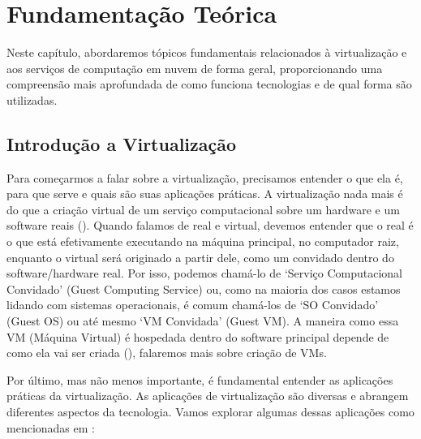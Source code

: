\chapter{Fundamentação Teórica}

Neste capítulo, abordaremos tópicos fundamentais relacionados à virtualização e aos serviços de computação em nuvem de forma geral, proporcionando uma compreensão mais aprofundada de como funciona tecnologias e de qual forma são utilizadas.


\section{Introdução a Virtualização}

Para começarmos a falar sobre a virtualização, precisamos entender o que ela é, para que serve e quais são suas aplicações práticas. A virtualização nada mais é do que a criação virtual de um serviço computacional sobre um hardware e um software reais (\cite{chirammal2016mastering}). Quando falamos de real e virtual, devemos entender que o real é o que está efetivamente executando na máquina principal, no computador raiz, enquanto o virtual será originado a partir dele, como um convidado dentro do software/hardware real. Por isso, podemos chamá-lo de `Serviço Computacional Convidado' (Guest Computing Service) ou, como na maioria dos casos estamos lidando com sistemas operacionais, é comum chamá-los de `SO Convidado' (Guest OS) ou até mesmo `VM Convidada' (Guest VM). A maneira como essa VM (Máquina Virtual) é hospedada dentro do software principal depende de como ela vai ser criada (\cite{chirammal2016mastering}), falaremos mais sobre criação de VMs.

Por último, mas não menos importante, é fundamental entender as aplicações práticas da virtualização. As aplicações de virtualização são diversas e abrangem diferentes aspectos da tecnologia. Vamos explorar algumas dessas aplicações como mencionadas em \citep{chirammal2016mastering}:

